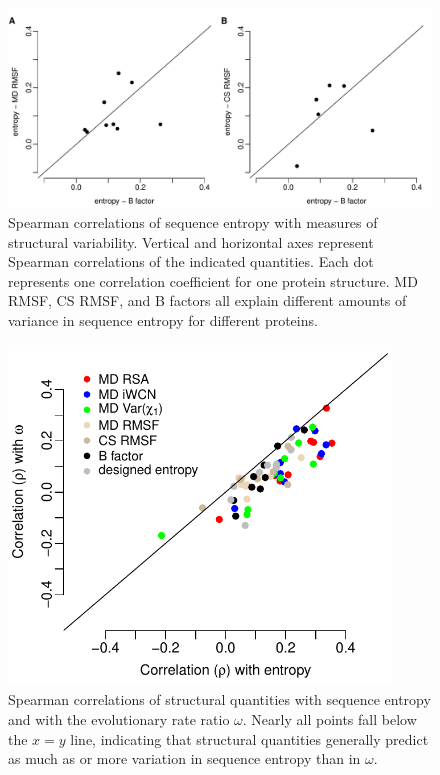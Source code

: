 \documentclass[smallextended]{svjour3}
\begin{document}
\begin{figure}[tbh]
\begin{center}
    \includegraphics[width=6.5in]{cor_entropy_bfca_rmsf.pdf} %
\end{center}
\caption{Spearman correlations of sequence entropy with measures of structural variability. Vertical and horizontal axes represent Spearman correlations of the indicated quantities. Each dot represents one correlation coefficient for one protein structure. MD RMSF, CS RMSF, and B factors all explain different amounts of variance in sequence entropy for different proteins.}
\label{fig:cor_entropy_bfca_rmsf}
\end{figure}

\begin{figure}[tbh]
\begin{center}
    \includegraphics[width=4in]{cor_entropy_omega.pdf} %
\end{center}
\caption{Spearman correlations of structural quantities with sequence entropy and with the evolutionary rate ratio $\omega$. Nearly all points fall below the $x=y$ line, indicating that structural quantities generally predict as much as or more variation in sequence entropy than in $\omega$.}
\label{fig:cor_entropy_omega}
\end{figure}
\end{document}
